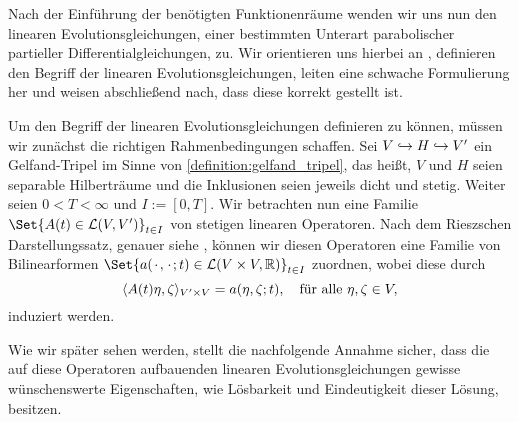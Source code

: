 \documentclass[../main.tex]{subfiles}
\begin{document}
Nach der Einführung der benötigten Funktionenräume wenden wir uns nun den linearen Evolutionsgleichungen, einer bestimmten Unterart parabolischer partieller Differentialgleichungen, zu.
Wir orientieren uns hierbei an \textcite{Lions:1971wp,Schwab:2009ec,Urban:2014kg},
definieren den Begriff der linearen Evolutionsgleichungen, leiten eine schwache Formulierung her und weisen abschließend nach, dass diese korrekt gestellt ist.

Um den Begriff der linearen Evolutionsgleichungen definieren zu können, müssen wir zunächst die richtigen Rahmenbedingungen schaffen.
Sei $V \denseinclusion H \denseinclusion V'$ ein Gelfand-Tripel im Sinne von \cref{definition:gelfand_tripel}, das heißt, $V$ und $H$ seien separable Hilberträume und die Inklusionen seien jeweils dicht und stetig.
Weiter seien $0 < T < \infty$ und $I := [0, T]$.
Wir betrachten nun eine Familie $\Set{A(t) \in \mathcal L(V, V')}_{t \in I}$ von stetigen linearen Operatoren.
Nach dem Rieszschen Darstellungssatz, genauer siehe \cite[Theorem \S{}22.1]{Halmos:1957vd}, können wir diesen Operatoren eine Familie von Bilinearformen $\Set{a(\blank, \blank; t) \in \mathcal L(V \times V, \mathbb{R})}_{t \in I}$ zuordnen, wobei diese durch
\begin{equation}
    \skp{A(t)\eta}{\zeta}{V' \times V} = a(\eta, \zeta; t), \quad \fa \eta, \zeta \in V,
\end{equation}
induziert werden.

Wie wir später sehen werden, stellt die nachfolgende Annahme sicher, dass die auf diese Operatoren aufbauenden linearen Evolutionsgleichungen gewisse wünschenswerte Eigenschaften, wie Lösbarkeit und Eindeutigkeit dieser Lösung, besitzen.
\end{document}

